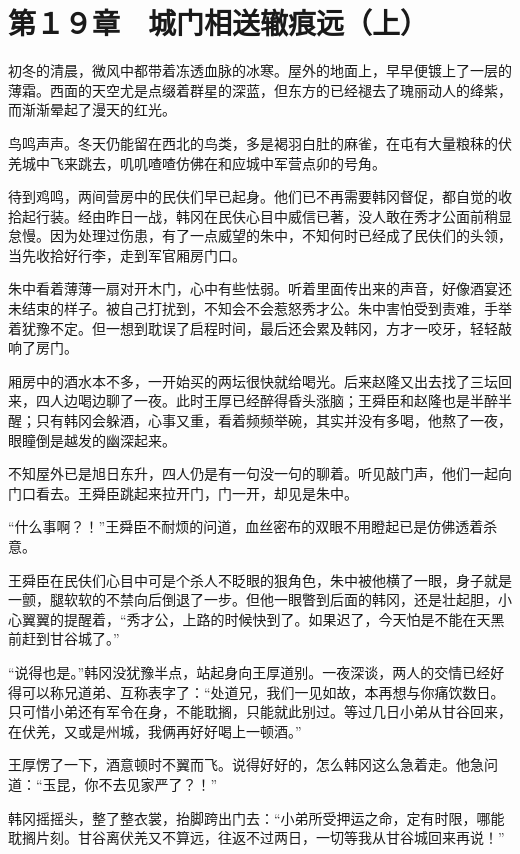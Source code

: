 \section{第１９章　城门相送辙痕远（上）}

初冬的清晨，微风中都带着冻透血脉的冰寒。屋外的地面上，早早便镀上了一层的薄霜。西面的天空尤是点缀着群星的深蓝，但东方的已经褪去了瑰丽动人的绛紫，而渐渐晕起了漫天的红光。

鸟鸣声声。冬天仍能留在西北的鸟类，多是褐羽白肚的麻雀，在屯有大量粮秣的伏羌城中飞来跳去，叽叽喳喳仿佛在和应城中军营点卯的号角。

待到鸡鸣，两间营房中的民伕们早已起身。他们已不再需要韩冈督促，都自觉的收拾起行装。经由昨日一战，韩冈在民伕心目中威信已著，没人敢在秀才公面前稍显怠慢。因为处理过伤患，有了一点威望的朱中，不知何时已经成了民伕们的头领，当先收拾好行李，走到军官厢房门口。

朱中看着薄薄一扇对开木门，心中有些怯弱。听着里面传出来的声音，好像酒宴还未结束的样子。被自己打扰到，不知会不会惹怒秀才公。朱中害怕受到责难，手举着犹豫不定。但一想到耽误了启程时间，最后还会累及韩冈，方才一咬牙，轻轻敲响了房门。

厢房中的酒水本不多，一开始买的两坛很快就给喝光。后来赵隆又出去找了三坛回来，四人边喝边聊了一夜。此时王厚已经醉得昏头涨脑；王舜臣和赵隆也是半醉半醒；只有韩冈会躲酒，心事又重，看着频频举碗，其实并没有多喝，他熬了一夜，眼瞳倒是越发的幽深起来。

不知屋外已是旭日东升，四人仍是有一句没一句的聊着。听见敲门声，他们一起向门口看去。王舜臣跳起来拉开门，门一开，却见是朱中。

“什么事啊？！”王舜臣不耐烦的问道，血丝密布的双眼不用瞪起已是仿佛透着杀意。

王舜臣在民伕们心目中可是个杀人不眨眼的狠角色，朱中被他横了一眼，身子就是一颤，腿软软的不禁向后倒退了一步。但他一眼瞥到后面的韩冈，还是壮起胆，小心翼翼的提醒着，“秀才公，上路的时候快到了。如果迟了，今天怕是不能在天黑前赶到甘谷城了。”

“说得也是。”韩冈没犹豫半点，站起身向王厚道别。一夜深谈，两人的交情已经好得可以称兄道弟、互称表字了：“处道兄，我们一见如故，本再想与你痛饮数日。只可惜小弟还有军令在身，不能耽搁，只能就此别过。等过几日小弟从甘谷回来，在伏羌，又或是州城，我俩再好好喝上一顿酒。”

王厚愣了一下，酒意顿时不翼而飞。说得好好的，怎么韩冈这么急着走。他急问道：“玉昆，你不去见家严了？！”

韩冈摇摇头，整了整衣裳，抬脚跨出门去：“小弟所受押运之命，定有时限，哪能耽搁片刻。甘谷离伏羌又不算远，往返不过两日，一切等我从甘谷城回来再说！”

